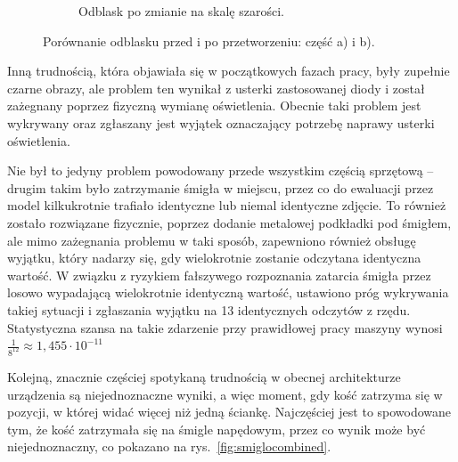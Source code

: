 \begin{figure}[H]
\begin{subfigure}[t]{0.45\linewidth}
        \caption{Odblask po zmianie na skalę szarości.}
        \label{fig:blaskproc}
    \end{subfigure}
    \caption{Porównanie odblasku przed i po przetworzeniu: część a) i b).}
    \label{fig:blaskcombined}
\end{figure}


Inną trudnością, która objawiała się w początkowych fazach pracy, były zupełnie czarne obrazy, ale
problem ten wynikał z usterki zastosowanej diody i został zażegnany poprzez fizyczną wymianę oświetlenia.
Obecnie taki problem jest wykrywany oraz zgłaszany jest wyjątek oznaczający potrzebę naprawy usterki oświetlenia.

Nie był to jedyny problem powodowany przede wszystkim częścią sprzętową -- drugim takim było zatrzymanie śmigła w miejscu,
przez co do ewaluacji przez model kilkukrotnie trafiało identyczne lub niemal identyczne zdjęcie.
To również zostało rozwiązane fizycznie, poprzez dodanie metalowej podkładki pod śmigłem,
ale mimo zażegnania problemu w taki sposób, zapewniono również obsługę wyjątku, który nadarzy się, gdy wielokrotnie zostanie odczytana identyczna wartość.
W związku z ryzykiem fałszywego rozpoznania zatarcia śmigła przez losowo wypadającą wielokrotnie identyczną wartość, ustawiono próg wykrywania takiej sytuacji i zgłaszania wyjątku na 13 identycznych odczytów z rzędu.
Statystyczna szansa na takie zdarzenie przy prawidłowej pracy maszyny wynosi
$\frac{1}{8^{12}} \approx 1{,}455 \cdot 10^{-11}$

Kolejną, znacznie częściej spotykaną trudnością w obecnej architekturze urządzenia są niejednoznaczne wyniki,
a więc moment, gdy kość zatrzyma się w pozycji, w której widać więcej niż jedną ściankę.
Najczęściej jest to spowodowane tym, że kość zatrzymała się na śmigle napędowym,
przez co wynik może być niejednoznaczny, co pokazano na rys.~\ref{fig:smiglocombined}.

